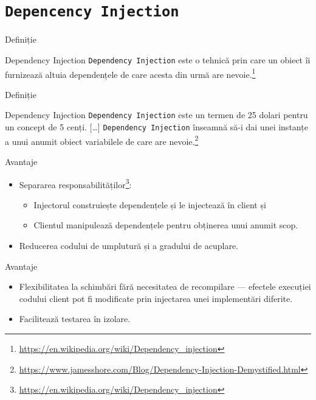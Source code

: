 \documentclass[presentation]{beamer}
\begin{document}
\section{\texttt{Depencency Injection}}
\label{sec:org5e8228d}
\begin{frame}[label={sec:org34d646c},fragile]{Definiție}
 \begin{block}{Dependency Injection}
\texttt{Dependency Injection} este o tehnică prin care un obiect îi furnizează altuia dependențele de care acesta din urmă are nevoie.\footnote{\url{https://en.wikipedia.org/wiki/Dependency\_injection}}
\end{block}
\end{frame}
\begin{frame}[label={sec:orgdf59dae},fragile]{Definiție}
 \begin{block}{Dependency Injection}
\texttt{Dependency Injection} este un termen de 25 dolari pentru un concept de 5 cenți. [\ldots{}] \texttt{Dependency Injection} înseamnă să-i dai unei instanțe a unui anumit obiect variabilele de care are nevoie.\footnote{\url{https://www.jamesshore.com/Blog/Dependency-Injection-Demystified.html}}
\end{block}
\end{frame}
\begin{frame}[label={sec:org5d64f76}]{Avantaje}
\begin{itemize}
\item Separarea responsabilităților\footnote{\url{https://en.wikipedia.org/wiki/Dependency\_injection}}:
\begin{itemize}
\item \alert{Injectorul} construiește dependențele și le injectează în client și
\item \alert{Clientul} manipulează dependențele pentru obținerea unui anumit scop.
\end{itemize}
\item Reducerea codului de umplutură și a gradului de acuplare.
\end{itemize}
\end{frame}
\begin{frame}[label={sec:orgbb25372}]{Avantaje}
\begin{itemize}
\item Flexibilitatea la schimbări fără necesitatea de recompilare --- efectele execuției codului client pot fi modificate prin injectarea unei implementări diferite.
\item Facilitează testarea în izolare.
\end{itemize}
\end{frame}
\end{document}
